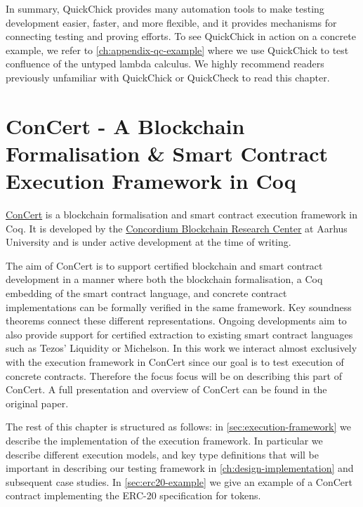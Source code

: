 \documentclass[twoside,11pt,openright]{report}
\newcommand{\cc}{ConCert}
\begin{document}
In summary, QuickChick provides many automation tools to make testing development easier, faster, and more flexible, and it provides mechanisms for connecting testing and proving efforts. To see QuickChick in action on a concrete example, we refer to \autoref{ch:appendix-qc-example} where we use QuickChick to test confluence of the untyped lambda calculus. We highly recommend readers previously unfamiliar with QuickChick or QuickCheck to read this chapter.


\chapter{ConCert - A Blockchain Formalisation \& Smart Contract Execution Framework in Coq}
\label{ch:concert}
\href{https://github.com/AU-COBRA/ConCert}{\cc{}} is a blockchain formalisation\cite{DBLP:journals/corr/abs-1907-10674} and smart contract execution framework\cite{nielsen2019smart} in Coq. It is developed by the \href{https://concordium.com/}{Concordium Blockchain Research Center} at Aarhus University and is under active development at the time of writing.

The aim of \cc{} is to support certified blockchain and smart contract development in a manner where both the blockchain formalisation, a Coq embedding of the smart contract language, and concrete contract implementations can be formally verified in the same framework. Key soundness theorems connect these different representations. Ongoing developments aim to also provide support for certified extraction to existing smart contract languages such as Tezos' Liquidity or Michelson. In this work we interact almost exclusively with the execution framework in \cc{} since our goal is to test execution of concrete contracts. Therefore the focus focus will be on describing this part of \cc{}. A full presentation and overview of \cc{} can be found in the original paper\cite{DBLP:journals/corr/abs-1907-10674}.

The rest of this chapter is structured as follows: in \autoref{sec:execution-framework} we describe the implementation of the execution framework. In particular we describe different execution models, and key type definitions that will be important in describing our testing framework in \autoref{ch:design-implementation} and subsequent case studies. In \autoref{sec:erc20-example} we give an example of a \cc{} contract implementing the ERC-20 specification for tokens.
\end{document}
